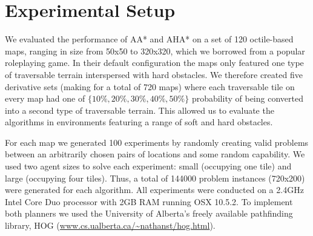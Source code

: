 \section{Experimental Setup}
We evaluated the performance of AA* and AHA* on a set of 120 octile-based maps, ranging in size from 50x50 to 320x320, which we borrowed from a popular roleplaying game.
In their default configuration the maps only featured one type of traversable terrain interspersed with hard obstacles. 
We therefore created five derivative sets (making for a total of 720 maps) where each traversable tile on every map had one of $\lbrace 10\%, 20\%, 30\%, 40\%, 50\% \rbrace$ probability of being converted into a second type of traversable terrain. 
This allowed us to evaluate the algorithms in environments featuring a range of soft and hard obstacles.
\par \indent
For each map we generated 100 experiments by randomly creating valid problems between an arbitrarily chosen pairs of locations and some random capability.
We used two agent sizes to solve each experiment: small (occupying one tile) and large (occupying four tiles). 
Thus, a total of 144000 problem instances (720x200) were generated for each algorithm. 
All experiments were conducted on a 2.4GHz Intel Core Duo processor with 2GB RAM running OSX 10.5.2.
To implement both planners we used the University of Alberta's freely available pathfinding library, HOG (\url{www.cs.ualberta.ca/~nathanst/hog.html}). 
